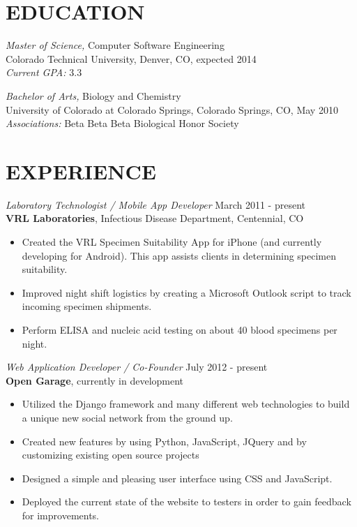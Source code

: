 \documentclass[margin]{res}
\begin{document}
\begin{resume}
\section{EDUCATION} 
		{\sl Master of Science,} Computer Software Engineering \\
		Colorado Technical University, Denver, CO, expected 2014 \\
		{\sl \indent Current GPA: } 3.3
		
		{\sl Bachelor of Arts,} Biology and Chemistry \\
                University of Colorado at Colorado Springs, Colorado Springs, CO, 
                May 2010 \\ 
		{\sl Associations:} Beta Beta Beta Biological Honor Society
 
\section{EXPERIENCE}
		{\sl Laboratory Technologist / Mobile App Developer} \hfill March 2011 - present \\
                	{\bf VRL Laboratories},
                	Infectious Disease Department, Centennial, CO 
                 	\begin{itemize}  \itemsep -2pt %
		\item Created the VRL Specimen Suitability App for iPhone (and currently developing for Android). 
			This app assists clients in determining specimen suitability.
                	\item	Improved night shift logistics by creating a Microsoft Outlook script
			to track incoming specimen shipments.
		\item	Perform ELISA and nucleic acid testing on about 40 blood specimens per night.
                	\end{itemize}
 
                {\sl Web Application Developer / Co-Founder} \hfill            July 2012 - present \\
                {\bf Open Garage},
		currently in development
                 	\begin{itemize}  \itemsep -2pt %
		\item Utilized the Django framework and many different web technologies to build a unique new social network from the ground up.
		\item Created new features by using Python, JavaScript, JQuery and by customizing existing open source projects
		\item Designed a simple and pleasing user interface using CSS and JavaScript.
		\item Deployed the current state of the website to testers in order to gain feedback for improvements.
                 	\end{itemize} 

\end{resume}
\end{document}
